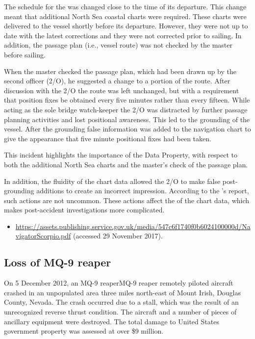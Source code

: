 The schedule for the  was changed close to the time of its departure. This change meant that additional North Sea coastal charts were required. These charts were delivered to the vessel shortly before its departure. However, they were not up to date with the latest corrections and they were not corrected prior to sailing. In addition, the passage plan (i.e., vessel route) was not checked by the master before sailing.

When the master checked the passage plan, which had been drawn up by the second officer (2/O), he suggested a change to a portion of the route. After discussion with the 2/O the route was left unchanged, but with a requirement that position fixes be obtained every five minutes rather than every fifteen. While acting as the sole bridge watch-keeper the 2/O was distracted by further passage planning activities and lost positional awareness. This led to the grounding of the vessel. After the grounding false \gls{information} was added to the navigation chart to give the appearance that five minute positional fixes had been taken.

This incident highlights the importance of the  Data Property, with respect to both the additional North Sea charts and the master's check of the passage plan.

In addition, the fluidity of the chart data allowed the 2/O to make false post-grounding additions to create an incorrect impression. According to the 's report, such actions are not uncommon. These actions affect the  of the chart data, which makes post-accident investigations more complicated.

\begin{samepage}
\begin{itemize}
  \item \raggedright{\href{https://assets.publishing.service.gov.uk/media/547c6f1740f0b6024100000d/NavigatorScorpio.pdf}{https://assets.publishing.service.gov.uk/media/547c6f1740f0b6024100000d/NavigatorScorpio.pdf} (accessed 29 November 2017).}
\end{itemize}
\end{samepage}


\subsection{Loss of MQ-9 reaper} \label{bkm:incacc:mq9reaper}
On 5 December 2012, an MQ-9 reaperMQ-9 reaper remotely piloted aircraft crashed in an unpopulated area three miles north-east of Mount Irish, Douglas County, Nevada. The crash occurred due to a stall, which was the result of an unrecognized reverse thrust condition. The aircraft and a number of pieces of ancillary equipment were destroyed. The total damage to United States government property was assessed at over \$9 million.

